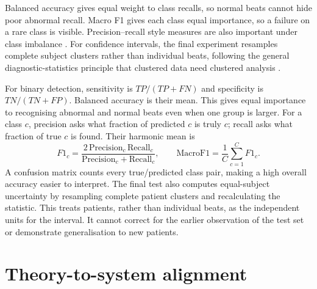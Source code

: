 Balanced accuracy gives equal weight to class recalls, so normal beats cannot
hide poor abnormal recall. Macro F1 gives each class equal importance, so a
failure on a rare class is visible. Precision--recall style measures are also
important under class imbalance \cite{saito2015pr}. For confidence intervals,
the final experiment resamples complete subject clusters rather than individual
beats, following the general diagnostic-statistics principle that clustered
data need clustered analysis \cite{rutter2000clustered}.

For binary detection, sensitivity is $TP/(TP+FN)$ and specificity is
$TN/(TN+FP)$. Balanced accuracy is their mean. This gives equal importance
to recognising abnormal and normal beats even when one group is larger.
For a class $c$, precision asks what fraction of predicted $c$ is truly $c$;
recall asks what fraction of true $c$ is found. Their harmonic mean is
\begin{equation}
 F1_c=\frac{2\,\mathrm{Precision}_c\,\mathrm{Recall}_c}
 {\mathrm{Precision}_c+\mathrm{Recall}_c},\qquad
 \mathrm{MacroF1}=\frac{1}{C}\sum_{c=1}^{C}F1_c.
\end{equation}
A confusion matrix counts every true/predicted class pair, making a high
overall accuracy easier to interpret. The final test also computes
equal-subject uncertainty by resampling complete patient clusters and
recalculating the statistic. This treats patients, rather than individual
beats, as the independent units for the interval. It cannot correct for the
earlier observation of the test set or demonstrate generalisation to new
patients.

\section{Theory-to-system alignment}

